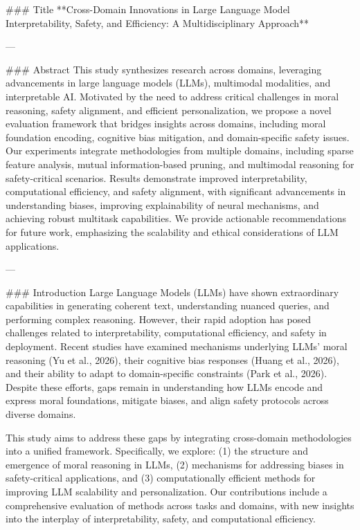 ### Title
**Cross-Domain Innovations in Large Language Model Interpretability, Safety, and Efficiency: A Multidisciplinary Approach**

---

### Abstract
This study synthesizes research across domains, leveraging advancements in large language models (LLMs), multimodal modalities, and interpretable AI. Motivated by the need to address critical challenges in moral reasoning, safety alignment, and efficient personalization, we propose a novel evaluation framework that bridges insights across domains, including moral foundation encoding, cognitive bias mitigation, and domain-specific safety issues. Our experiments integrate methodologies from multiple domains, including sparse feature analysis, mutual information-based pruning, and multimodal reasoning for safety-critical scenarios. Results demonstrate improved interpretability, computational efficiency, and safety alignment, with significant advancements in understanding biases, improving explainability of neural mechanisms, and achieving robust multitask capabilities. We provide actionable recommendations for future work, emphasizing the scalability and ethical considerations of LLM applications.

---

### Introduction
Large Language Models (LLMs) have shown extraordinary capabilities in generating coherent text, understanding nuanced queries, and performing complex reasoning. However, their rapid adoption has posed challenges related to interpretability, computational efficiency, and safety in deployment. Recent studies have examined mechanisms underlying LLMs' moral reasoning (Yu et al., 2026), their cognitive bias responses (Huang et al., 2026), and their ability to adapt to domain-specific constraints (Park et al., 2026). Despite these efforts, gaps remain in understanding how LLMs encode and express moral foundations, mitigate biases, and align safety protocols across diverse domains.

This study aims to address these gaps by integrating cross-domain methodologies into a unified framework. Specifically, we explore: (1) the structure and emergence of moral reasoning in LLMs, (2) mechanisms for addressing biases in safety-critical applications, and (3) computationally efficient methods for improving LLM scalability and personalization. Our contributions include a comprehensive evaluation of methods across tasks and domains, with new insights into the interplay of interpretability, safety, and computational efficiency.

